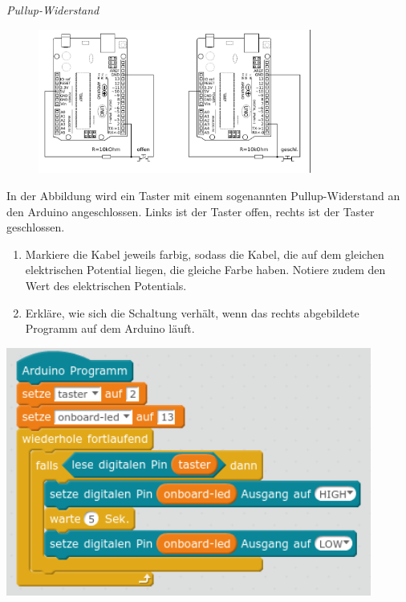 \begin{aufgabe} \emph{Pullup-Widerstand}
	
	\begin{figure}[H]
		\centering
		\includegraphics[width=0.8\textwidth]{./Zeichnungen/schaltplan-pullup.png}
	\end{figure}
	In der Abbildung wird ein Taster mit einem sogenannten Pullup-Widerstand an den Arduino angeschlossen. Links ist der Taster offen, rechts ist der Taster geschlossen.
	
	\bigskip
	\begin{minipage}{0.48\textwidth}
		\begin{enumerate}[label=\alph*), itemsep=0ex]
			\item Markiere die Kabel jeweils farbig, sodass die Kabel, die auf dem gleichen elektrischen Potential liegen, die gleiche Farbe haben. Notiere zudem den Wert des elektrischen Potentials.
			\item Erkläre, wie sich die Schaltung verhält, wenn das rechts abgebildete Programm auf dem Arduino läuft.
		\end{enumerate}
	\end{minipage}
	\hfill
	\begin{minipage}{0.5\textwidth}
		\centering
		\includegraphics[width=0.9\textwidth]{./pics/programm-pullup-schaltung.png}
	\end{minipage}
\end{aufgabe}
\vfill


